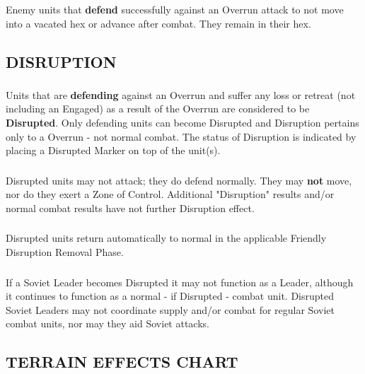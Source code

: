 \subsubsection{} Enemy units that \textbf{defend} successfully against an Overrun attack to not move into a vacated hex or advance after combat. They remain in their hex.

\subsection{DISRUPTION}

\subsubsection{} Units that are \textbf{defending} against an Overrun and suffer any loss or retreat (not including an Engaged) as a result of the Overrun are considered to be \textbf{Disrupted}. Only defending units can become Disrupted and Disruption pertains only to a Overrun - not normal combat. The status of Disruption is indicated by placing a Disrupted Marker on top of the unit(s).

\subsubsection{} Disrupted units may not attack; they do defend normally. They may \textbf{not} move, nor do they exert a Zone of Control. Additional "Disruption" results and/or normal combat results have not further Disruption effect.

\subsubsection{} Disrupted units return automatically to normal in the applicable Friendly Disruption Removal Phase.

\subsubsection{} If a Soviet Leader becomes Disrupted it may not function as a Leader, although it continues to function as a normal - if Disrupted - combat unit. Disrupted Soviet Leaders may not coordinate supply and/or combat for regular Soviet combat units, nor may they aid Soviet attacks.

\subsection{TERRAIN EFFECTS CHART}
